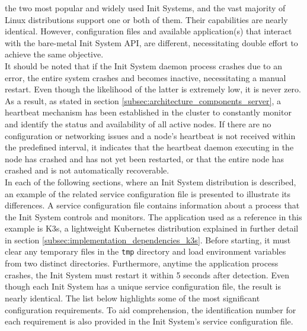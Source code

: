 the two most popular and widely used Init Systems, and the vast majority of
Linux distributions support one or both of them. Their capabilities are nearly identical.
However, configuration files and available application(s) that interact with the
bare-metal Init System API, are different, necessitating double effort to
achieve the same objective. \\ %
It should be noted that if the Init System daemon process crashes due to an
error, the entire system crashes and becomes inactive, necessitating a manual
restart. Even though the likelihood of the latter is extremely low, it is never
zero. As a result, as stated in section
\ref{subsec:architecture_components_server}, a heartbeat mechanism has been established
in the cluster to constantly monitor and identify the status and availability of
all active nodes. If there are no configuration or networking issues and a node's
heartbeat is not received within the predefined interval, it indicates that the heartbeat
daemon executing in the node has crashed and has not yet been restarted, or that
the entire node has crashed and is not automatically recoverable. \\ %
In each of the following sections, where an Init System distribution is described,
an example of the related service configuration file is presented to illustrate
its differences. A service configuration file contains information about a process
that the Init System controls and monitors. The application used as a reference
in this example is K3s, a lightweight Kubernetes distribution explained in further
detail in section \ref{subsec:implementation_dependencies_k3s}. Before starting,
it must clear any temporary files in the \texttt{tmp} directory and load
environment variables from two distinct directories. Furthermore, anytime the
application process crashes, the Init System must restart it within 5 seconds after
detection. Even though each Init System has a unique service configuration file,
the result is nearly identical. The list below highlights some of the most
significant configuration requirements. To aid comprehension, the identification
number for each requirement is also provided in the Init System's service
configuration file.
